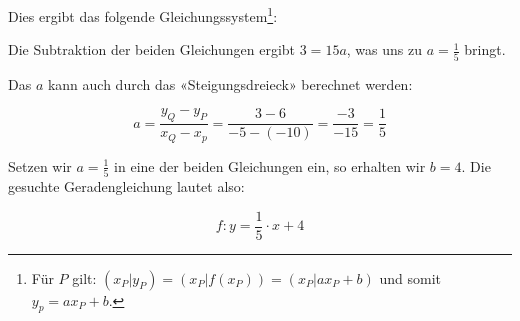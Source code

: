 \noTRAINER{\vspace{12mm}}

Dies ergibt das folgende Gleichungssystem\footnote{Für $P$ gilt: $(x_P|y_P)=(x_P|f(x_P))=(x_P|ax_P+b)$ und somit $y_p =ax_P + b$.}:


Die Subtraktion der beiden Gleichungen ergibt $3 = 15a$, was uns zu $a=\frac{1}{5}$ bringt.

Das $a$ kann auch durch das «Steigungsdreieck» berechnet werden:

$$a = \frac{y_Q-y_P}{x_Q-x_p} = \frac{3 - 6}{-5 - (-10)} = \frac{-3}{-15} = \frac{1}{5}$$

Setzen wir $a=\frac{1}{5}$ in eine der beiden Gleichungen ein, so erhalten wir $b=4$. Die gesuchte Geradengleichung lautet also:

$$f: y=\frac{1}{5}\cdot{}x + 4$$


\newpage

